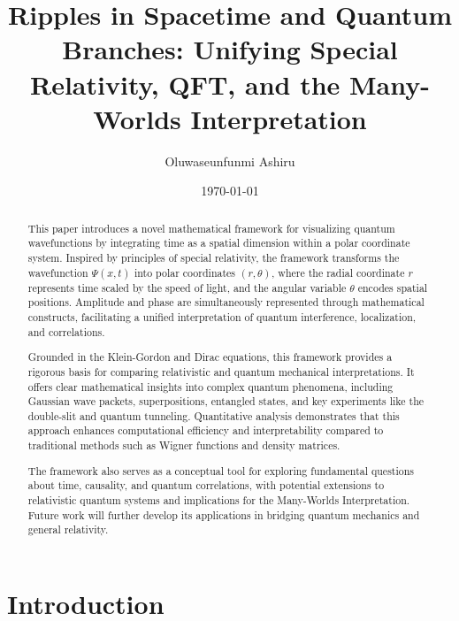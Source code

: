 \documentclass{article}
\begin{document}
\title{Ripples in Spacetime and Quantum Branches: Unifying Special Relativity, QFT, and the Many-Worlds Interpretation}
\author{Oluwaseunfunmi Ashiru}
\date{\today}
\maketitle 

\begin{abstract}
    This paper introduces a novel mathematical framework for visualizing quantum wavefunctions by integrating time as a spatial dimension within a polar coordinate system. Inspired by principles of special relativity, the framework transforms the wavefunction \(\Psi(x, t)\) into polar coordinates \((r, \theta)\), where the radial coordinate \(r\) represents time scaled by the speed of light, and the angular variable \(\theta\) encodes spatial positions. Amplitude and phase are simultaneously represented through mathematical constructs, facilitating a unified interpretation of quantum interference, localization, and correlations.

    Grounded in the Klein-Gordon and Dirac equations, this framework provides a rigorous basis for comparing relativistic and quantum mechanical interpretations. It offers clear mathematical insights into complex quantum phenomena, including Gaussian wave packets, superpositions, entangled states, and key experiments like the double-slit and quantum tunneling. Quantitative analysis demonstrates that this approach enhances computational efficiency and interpretability compared to traditional methods such as Wigner functions and density matrices.

    The framework also serves as a conceptual tool for exploring fundamental questions about time, causality, and quantum correlations, with potential extensions to relativistic quantum systems and implications for the Many-Worlds Interpretation. Future work will further develop its applications in bridging quantum mechanics and general relativity.
\end{abstract}

\newpage

\tableofcontents

\newpage

\section{Introduction}
\end{document}
